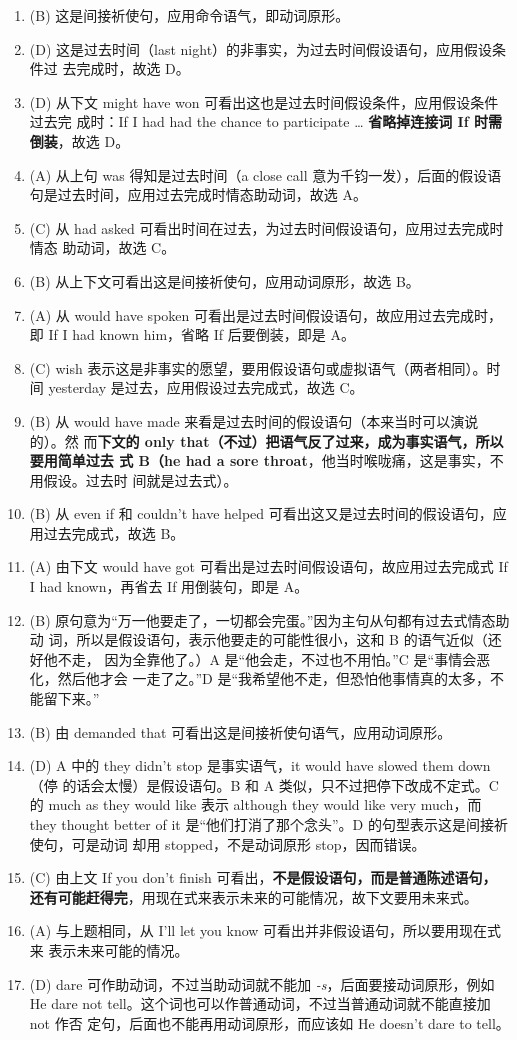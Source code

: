 \begin{enumerate}
\item (B) 这是间接祈使句，应用命令语气，即动词原形。
\item (D) 这是过去时间（last night）的非事实，为过去时间假设语句，应用假设条件过
  去完成时，故选 D。
\item (D) 从下文 might have won 可看出这也是过去时间假设条件，应用假设条件过去完
  成时：If I had had the chance to participate \ldots{} \textbf{省略掉连接词 If 时需
    倒装}，故选 D。
\item (A) 从上句 was 得知是过去时间（a close call 意为千钧一发），后面的假设语
  句是过去时间，应用过去完成时情态助动词，故选 A。
\item (C) 从 had asked 可看出时间在过去，为过去时间假设语句，应用过去完成时情态
  助动词，故选 C。
\item (B) 从上下文可看出这是间接祈使句，应用动词原形，故选 B。
\item (A) 从 would have spoken 可看出是过去时间假设语句，故应用过去完成时，
  即 If I had known him，省略 If 后要倒装，即是 A。
\item (C) wish 表示这是非事实的愿望，要用假设语句或虚拟语气（两者相同）。时
  间 yesterday 是过去，应用假设过去完成式，故选 C。
\item (B) 从 would have made 来看是过去时间的假设语句（本来当时可以演说的）。然
  而\textbf{下文的 only that（不过）把语气反了过来，成为事实语气，所以要用简单过去
    式 B（he had a sore throat}，他当时喉咙痛，这是事实，不用假设。过去时
  间就是过去式）。
\item (B) 从 even if 和 couldn't have helped 可看出这又是过去时间的假设语句，应
  用过去完成式，故选 B。
\item (A) 由下文 would have got 可看出是过去时间假设语句，故应用过去完成式 If I
  had known，再省去 If 用倒装句，即是 A。
\item (B) 原句意为“万一他要走了，一切都会完蛋。”因为主句从句都有过去式情态助动
  词，所以是假设语句，表示他要走的可能性很小，这和 B 的语气近似（还好他不走，
  因为全靠他了。）A 是“他会走，不过也不用怕。”C 是“事情会恶化，然后他才会
  一走了之。”D 是“我希望他不走，但恐怕他事情真的太多，不能留下来。”
\item (B) 由 demanded that 可看出这是间接祈使句语气，应用动词原形。
\item (D) A 中的 they didn't stop 是事实语气，it would have slowed them down（停
  的话会太慢）是假设语句。B 和 A 类似，只不过把停下改成不定式。C 的 much as
  they would like 表示 although they would like very much，而 they thought
  better of it 是“他们打消了那个念头”。D 的句型表示这是间接祈使句，可是动词
  却用 stopped，不是动词原形 stop，因而错误。
\item (C) 由上文 If you don't finish 可看出，\textbf{不是假设语句，而是普通陈述语句，
    还有可能赶得完}，用现在式来表示未来的可能情况，故下文要用未来式。
\item (A) 与上题相同，从 I'll let you know 可看出并非假设语句，所以要用现在式来
  表示未来可能的情况。
\item (D) dare 可作助动词，不过当助动词就不能加 \emph{-s}，后面要接动词原形，例如 He
  dare not tell。这个词也可以作普通动词，不过当普通动词就不能直接加 not 作否
  定句，后面也不能再用动词原形，而应该如 He doesn't dare to tell。


\end{enumerate}
